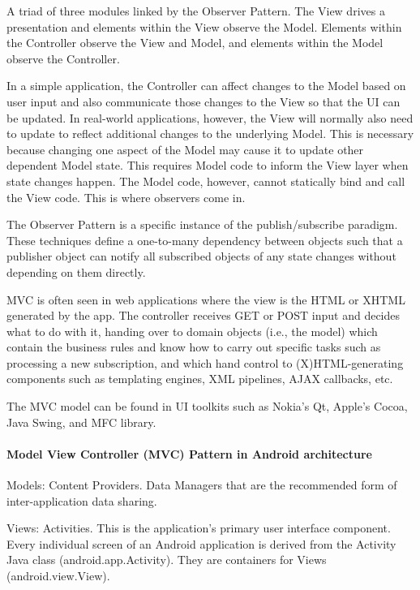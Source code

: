 \documentclass{book}
\begin{document}
A triad of three modules linked by the Observer Pattern\label{ObserverPattern}. 
The View drives a presentation and elements within the View observe the Model.
Elements within the Controller observe the View and Model, and elements within the Model observe the Controller.

In a simple application, the Controller can affect changes to the Model based on user input and also communicate those changes to the View so that the UI can be updated.
In real-world applications, however, the View will normally also need to update to reflect additional changes to the underlying Model. 
This is necessary because changing one aspect of the Model may cause it to update other dependent Model state.
This requires Model code to inform the View layer when state changes happen. The Model code, however, cannot statically bind and call the View code. This is where observers come in.

The Observer Pattern is a specific instance of the publish/subscribe paradigm.
These techniques define a one-to-many dependency between objects such that a publisher object can notify all subscribed objects of any state changes without depending on them directly.

MVC is often seen in web applications where the view is the HTML or XHTML generated by the app.
The controller receives GET or POST input and decides what to do with it, handing over to domain objects (i.e., the model) which contain the business rules
and know how to carry out specific tasks such as processing a new subscription,
and which hand control to (X)HTML-generating components such as templating engines, XML pipelines, AJAX callbacks, etc.

The MVC model can be found in UI toolkits such as Nokia's Qt, Apple's Cocoa, Java Swing, and MFC library.

\paragraph{Model View Controller (MVC) Pattern in Android architecture}

Models: Content Providers.
Data Managers that are the recommended form of inter-application data sharing.

Views: Activities.
This is the application's primary user interface component. Every individual screen of an Android application is derived from the Activity Java class (android.app.Activity).
They are containers for Views (android.view.View).
\end{document}
